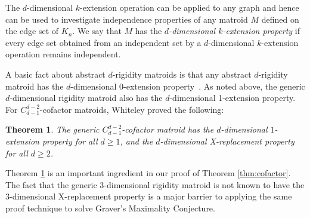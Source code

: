 \documentclass{daj}
\newtheorem{theorem}[thm]{Theorem}\theoremstyle{plain}
\newtheorem{conjecture}[thm]{Conjecture}\theoremstyle{plain}
\begin{document}
The $d$-dimensional $k$-extension operation can be applied to any graph and hence can be used to investigate independence properties of any matroid $M$ defined on the edge set of $K_n$.
%
%
%
%
We say that $M$ has the {\em $d$-dimensional $k$-extension property} if
every edge set obtained from an independent set by a $d$-dimensional $k$-extension operation remains independent.

A basic fact about abstract $d$-rigidity matroids is that any abstract $d$-rigidity matroid has the $d$-dimensional 0-extension property~\cite{GSS93}.
As noted above, the generic $d$-dimensional rigidity matroid also has the $d$-dimensional 1-extension property.
For $C_{d-1}^{d-2}$-cofactor matroids, Whiteley \cite[Theorem 11.4.1]{Wsurvey} proved the following:
\begin{theorem}
\label{thm:construction_cofactor}
The generic $C_{d-1}^{d-2}$-cofactor matroid has the $d$-dimensional $1$-extension property for all $d\geq 1$, and the $d$-dimensional X-replacement property for all $d\geq 2$.
\end{theorem}

Theorem \ref{thm:construction_cofactor} is an important ingredient  in our proof of Theorem \ref{thm:cofactor}. The fact that the generic $3$-dimensional rigidity matroid  is not known to have the $3$-dimensional X-replacement property is a major barrier to applying the same proof technique to solve Graver's Maximality Conjecture.
\end{document}
